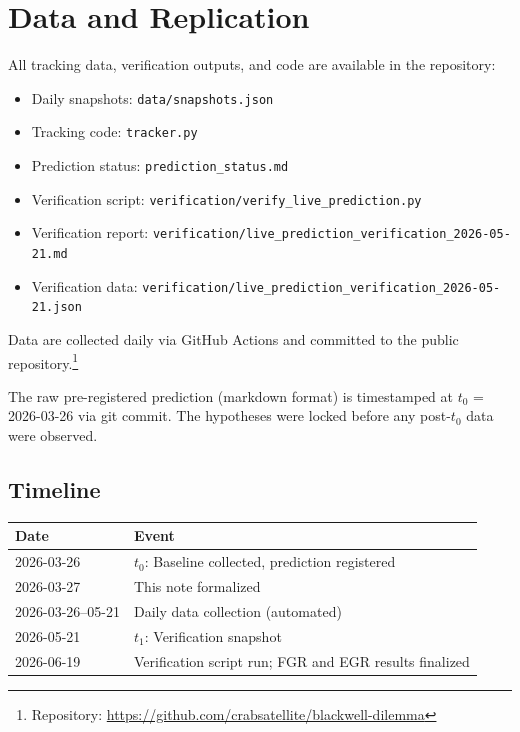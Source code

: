 \documentclass[12pt]{article}
\begin{document}
\section{Data and Replication}

All tracking data, verification outputs, and code are available in the repository:

\begin{itemize}
\item Daily snapshots: \texttt{data/snapshots.json}
\item Tracking code: \texttt{tracker.py}
\item Prediction status: \texttt{prediction\_status.md}
\item Verification script: \texttt{verification/verify\_live\_prediction.py}
\item Verification report: \texttt{verification/live\_prediction\_verification\_2026-05-21.md}
\item Verification data: \texttt{verification/live\_prediction\_verification\_2026-05-21.json}
\end{itemize}

Data are collected daily via GitHub Actions and committed to the public repository.\footnote{Repository: \url{https://github.com/crabsatellite/blackwell-dilemma}}

The raw pre-registered prediction (markdown format) is timestamped at $t_0$ = 2026-03-26 via git commit. The hypotheses were locked before any post-$t_0$ data were observed.

\subsection*{Timeline}

\begin{center}
\begin{tabular}{ll}
\toprule
Date & Event \\
\midrule
2026-03-26 & $t_0$: Baseline collected, prediction registered \\
2026-03-27 & This note formalized \\
2026-03-26--05-21 & Daily data collection (automated) \\
2026-05-21 & $t_1$: Verification snapshot \\
2026-06-19 & Verification script run; FGR and EGR results finalized \\
\bottomrule
\end{tabular}
\end{center}
\end{document}
